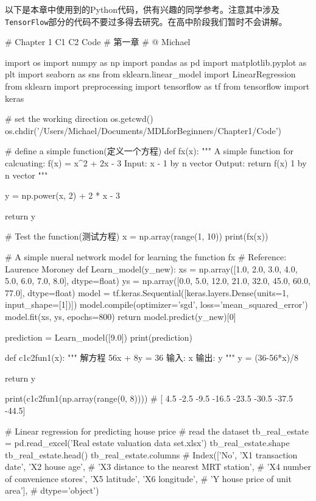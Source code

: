 \documentclass[12pt]{article}
\numberwithin{figure}{section}
\numberwithin{equation}{section}
\begin{document}
以下是本章中使用到的Python代码，供有兴趣的同学参考。注意其中涉及\texttt{TensorFlow}部分的代码不要过多得去研究。在高中阶段我们暂时不会讲解。
\begin{python}
# Chapter 1 C1 C2 Code
# 第一章
# @ Michael


import os
import numpy as np
import pandas as pd
import matplotlib.pyplot as plt
import seaborn as sns
from sklearn.linear_model import LinearRegression
from sklearn import preprocessing
import tensorflow as tf
from tensorflow import keras


# set the working direction
os.getcwd()
os.chdir('/Users/Michael/Documents/MDLforBeginners/Chapter1/Code')

# define a simple function(定义一个方程)
def fx(x):
    """
    A simple function for calcuating:
        f(x) = x^2 + 2x - 3
    Input: x - 1 by n vector
    Output: return f(x) 1 by n vector
    """

    y = np.power(x, 2) + 2 * x - 3

    return y


# Test the function(测试方程)
x = np.array(range(1, 10))
print(fx(x))


# A simple nueral network model for learning the function fx
# Reference: Laurence Moroney
def Learn_model(y_new):
    xs = np.array([1.0, 2.0, 3.0, 4.0, 5.0, 6.0, 7.0, 8.0], dtype=float)
    ys = np.array([0.0, 5.0, 12.0, 21.0, 32.0, 45.0, 60.0, 77.0], dtype=float)
    model = tf.keras.Sequential([keras.layers.Dense(units=1, input_shape=[1])])
    model.compile(optimizer='sgd', loss='mean_squared_error')
    model.fit(xs, ys, epochs=800)
    return model.predict(y_new)[0]


prediction = Learn_model([9.0])
print(prediction)


def c1c2fun1(x):
    """
    解方程 56x + 8y = 36
    输入: x
    输出: y
    """
    y = (36-56*x)/8

    return y


print(c1c2fun1(np.array(range(0, 8))))
# [ 4.5 -2.5  -9.5 -16.5 -23.5 -30.5 -37.5 -44.5]


# Linear regression for predicting house price
# read the dataset
tb_real_estate = pd.read_excel('Real estate valuation data set.xlsx')
tb_real_estate.shape
tb_real_estate.head()
tb_real_estate.columns
# Index(['No', 'X1 transaction date', 'X2 house age',
#        'X3 distance to the nearest MRT station',
#        'X4 number of convenience stores', 'X5 latitude', 'X6 longitude',
#        'Y house price of unit area'],
#       dtype='object')


\end{python}
\end{document}
